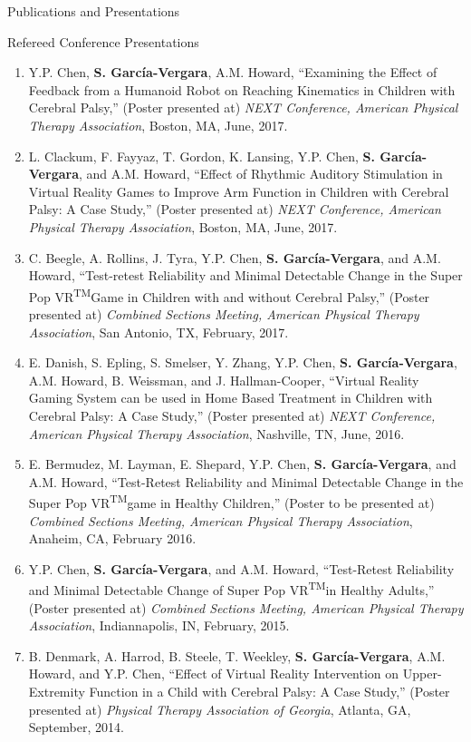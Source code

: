 \documentclass{resume} %
\newcommand{\Sergio}{\textbf{S. Garc\'{i}a-Vergara}}
\newcommand{\SuperPop}{Super Pop VR\textsuperscript{TM}\space}
\begin{document}
\begin{rSection}{Publications and Presentations}
\begin{rSubsection}{Refereed Conference Presentations}{}{}{}
\begin{enumerate}
\item Y.P. Chen, \Sergio, A.M. Howard, ``Examining the Effect of Feedback from a
  Humanoid Robot on Reaching Kinematics in Children with Cerebral Palsy,''
  (Poster presented at) \textit{NEXT Conference, American Physical Therapy
    Association}, Boston, MA, June, 2017.

\item L. Clackum, F. Fayyaz, T. Gordon, K. Lansing, Y.P. Chen, \Sergio, and
  A.M. Howard, ``Effect of Rhythmic Auditory Stimulation in Virtual Reality
  Games to Improve Arm Function in Children with Cerebral Palsy: A Case Study,''
  (Poster presented at) \textit{NEXT Conference, American Physical Therapy
    Association}, Boston, MA, June, 2017.

\item C. Beegle, A. Rollins, J. Tyra, Y.P. Chen, \Sergio, and A.M. Howard,
  ``Test-retest Reliability and Minimal Detectable Change in the \SuperPop Game
  in Children with and without Cerebral Palsy,'' (Poster presented at)
  \textit{Combined Sections Meeting, American Physical Therapy Association}, San
  Antonio, TX, February, 2017.

\item E. Danish, S. Epling, S. Smelser, Y. Zhang, Y.P. Chen, \Sergio,
  A.M. Howard, B. Weissman, and J. Hallman-Cooper, ``Virtual Reality Gaming
  System can be used in Home Based Treatment in Children with Cerebral Palsy: A
  Case Study,'' (Poster presented at) \textit{NEXT Conference, American Physical
    Therapy Association}, Nashville, TN, June, 2016.

\item E. Bermudez, M. Layman, E. Shepard, Y.P. Chen, \Sergio, and A.M. Howard,
  ``Test-Retest Reliability and Minimal Detectable Change in the \SuperPop game
  in Healthy Children,'' (Poster to be presented at) \textit{Combined Sections
    Meeting, American Physical Therapy Association}, Anaheim, CA, February 2016.

\item Y.P. Chen, \Sergio, and A.M. Howard, ``Test-Retest Reliability and Minimal
  Detectable Change of \SuperPop in Healthy Adults,'' (Poster presented at)
  \textit{Combined Sections Meeting, American Physical Therapy Association},
  Indiannapolis, IN, February, 2015.

\item B. Denmark, A. Harrod, B. Steele, T. Weekley, \Sergio, A.M. Howard, and
  Y.P. Chen, ``Effect of Virtual Reality Intervention on Upper-Extremity
  Function in a Child with Cerebral Palsy: A Case Study,'' (Poster presented at)
  \textit{Physical Therapy Association of Georgia}, Atlanta, GA, September,
  2014.

\end{enumerate}
\end{rSubsection}



\end{rSection}
\end{document}
